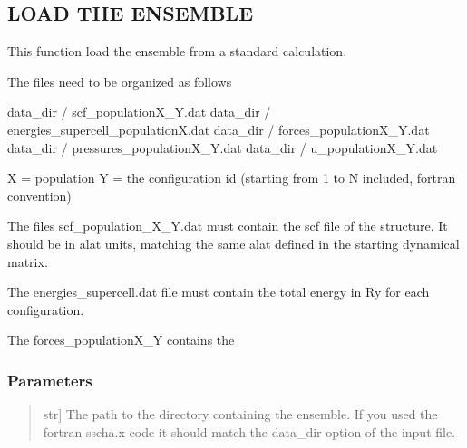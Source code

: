 \documentclass[a4paper,11pt,english]{sphinxmanual}
\begin{document}
\begin{fulllineitems}
\begin{fulllineitems}
\begin{quote}
\begin{description}
\end{description}
\end{quote}

\end{fulllineitems}


\begin{fulllineitems}
\label{\detokenize{apireference:sscha.Ensemble.Ensemble.load}}
\pysigstartsignatures
{}
\pysigstopsignatures

\subsection{LOAD THE ENSEMBLE}
\label{\detokenize{apireference:load-the-ensemble}}
\sphinxAtStartPar
This function load the ensemble from a standard calculation.

\sphinxAtStartPar
The files need to be organized as follows

\sphinxAtStartPar
data\_dir / scf\_populationX\_Y.dat
data\_dir / energies\_supercell\_populationX.dat
data\_dir / forces\_populationX\_Y.dat
data\_dir / pressures\_populationX\_Y.dat
data\_dir / u\_populationX\_Y.dat

\sphinxAtStartPar
X = population
Y = the configuration id (starting from 1 to N included, fortran convention)

\sphinxAtStartPar
The files scf\_population\_X\_Y.dat must contain the scf file of the structure.
It should be in alat units, matching the same alat defined in the starting
dynamical matrix.

\sphinxAtStartPar
The energies\_supercell.dat file must contain the total energy in Ry for
each configuration.

\sphinxAtStartPar
The forces\_populationX\_Y contains the


\subsubsection{Parameters}
\label{\detokenize{apireference:id17}}\begin{quote}
\begin{description}
\sphinxlineitem{data\_dir}{[}str{]}
\sphinxAtStartPar
The path to the directory containing the ensemble. If you used
the fortran sscha.x code it should match the data\_dir option of the
input file.


\end{description}
\end{quote}
\end{fulllineitems}
\end{fulllineitems}
\end{document}
